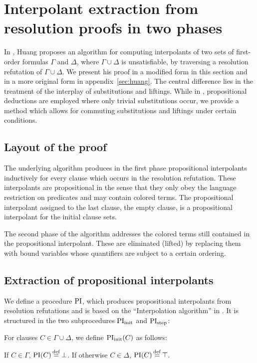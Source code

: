 \chapter{Interpolant extraction from resolution proofs in two phases}
\label{sec:two_phases}

In \cite{Huang95}, Huang proposes an algorithm for computing interpolants of two sets of first-order formulas $\Gamma$ and $\Delta$, where $\Gamma\cup\Delta$ is unsatisfiable, by traversing a resolution refutation of $\Gamma \cup \Delta$.
We present his proof in a modified form in this section and in a more original form in appendix~\ref{sec:huang}.
The central difference lies in the treatment of the interplay of substitutions and liftings. While in \cite{Huang95}, propositional deductions are employed where only trivial substitutions occur, we provide a method which allows for commuting substitutions and liftings under certain conditions.

\section{Layout of the proof}

The underlying algorithm produces in the first phase propositional interpolants inductively for every clause which occurs in the resolution refutation.
These interpolants are propositional in the sense that they only obey the language restriction on predicates and may contain colored terms.
The propositional interpolant assigned to the last clause, the empty clause, is a propositional interpolant for the initial clause sets.

The second phase of the algorithm addresses the colored terms still contained in the propositional interpolant.
These are eliminated (lifted) by replacing them with bound variables whose quantifiers are subject to a certain ordering.



\section{Extraction of propositional interpolants}

We define a procedure $\operatorname{PI}$, which produces propositional interpolants from resolution refutations and is based on the ``Interpolation algorithm'' in \cite{Huang95}.
It is structured in the two subprocedures $\PIinit$ and $\operatorname{PI}_{\mathrm{step}}$:

\begin{defi}[$\PIinit$]
	For clauses $C \in \Gamma\cup\Delta$, we define $\operatorname{PI}_{\mathrm{init}}(C)$ as follows:

	If $C \in \Gamma$, $\PI(C) \defeq \bot$.
	If otherwise $C \in \Delta$, $\PI(C) \defeq \top$.
\end{defi}

